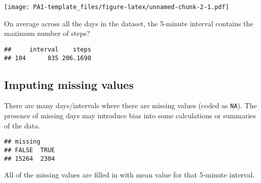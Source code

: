 \documentclass[
]{article}
\newenvironment{Shaded}{\begin{snugshade}}{\end{snugshade}}
\newcommand{\CommentTok}[1]{\textcolor[rgb]{0.56,0.35,0.01}{\textit{#1}}}
\newcommand{\KeywordTok}[1]{\textcolor[rgb]{0.13,0.29,0.53}{\textbf{#1}}}
\newcommand{\NormalTok}[1]{#1}
\newcommand{\OperatorTok}[1]{\textcolor[rgb]{0.81,0.36,0.00}{\textbf{#1}}}
\newcommand{\StringTok}[1]{\textcolor[rgb]{0.31,0.60,0.02}{#1}}
\begin{document}
\texttt{[image: PA1-template\_files/figure-latex/unnamed-chunk-2-1.pdf]}

On average across all the days in the dataset, the 5-minute interval
contains the maximum number of steps?

\begin{Shaded}
\end{Shaded}

\begin{verbatim}
##     interval    steps
## 104      835 206.1698
\end{verbatim}

\hypertarget{imputing-missing-values}{%
\subsection{Imputing missing values}\label{imputing-missing-values}}

There are many days/intervals where there are missing values (coded as
\texttt{NA}). The presence of missing days may introduce bias into some
calculations or summaries of the data.

\begin{Shaded}
\end{Shaded}

\begin{verbatim}
## missing
## FALSE  TRUE 
## 15264  2304
\end{verbatim}

All of the missing values are filled in with mean value for that
5-minute interval.
\end{document}
